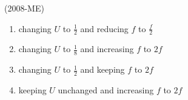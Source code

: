 \documentclass[journal]{IEEEtran}
\begin{document}
\begin{enumerate}
 \hfill(2008-ME)
 \begin{enumerate}
     \item changing $U$ to $\frac{1}{2}$ and reducing $f$ to $\frac{f}{2}$
     \item changing $U$ to $\frac{1}{8}$ and increasing $f$ to $2f$
     \item changing $U$ to $\frac{1}{2}$ and keeping $f$ to $2f$
     \item keeping  $U$ unchanged and increasing $f$ to $2f$
 \end{enumerate}
\end{enumerate}
\end{document}
